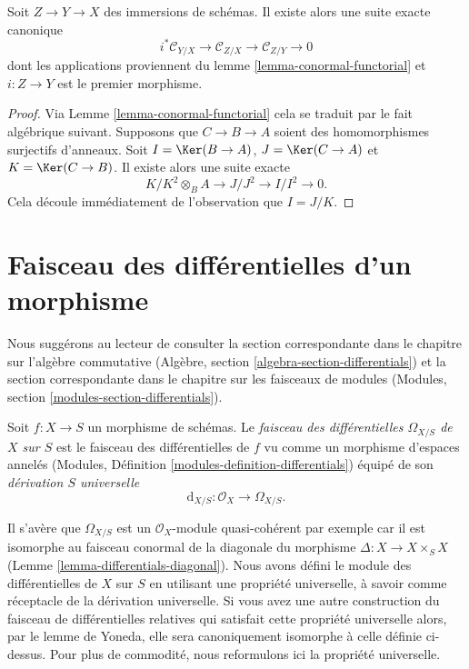 \begin{lemma}
\label{lemma-transitivity-conormal}
Soit $Z \to Y \to X$ des immersions de schémas. Il existe alors une suite exacte
canonique
$$
i^*\mathcal{C}_{Y/X} \to
\mathcal{C}_{Z/X} \to
\mathcal{C}_{Z/Y} \to 0
$$
dont les applications proviennent
du lemme \ref{lemma-conormal-functorial} et
$i : Z \to Y$ est le premier morphisme.
\end{lemma}

\begin{proof}
Via
Lemme \ref{lemma-conormal-functorial} cela se traduit
par le fait algébrique suivant. Supposons que $C \to B \to A$
soient des homomorphismes surjectifs d'anneaux. Soit $I = \Ker(B \to A)$,
$J = \Ker(C \to A)$ et $K = \Ker(C \to B)$. Il existe
alors une suite exacte
$$
K/K^2 \otimes_B A \to J/J^2 \to I/I^2 \to 0.
$$
Cela découle immédiatement de l'observation que $I = J/K$.
\end{proof}










\section{Faisceau des différentielles d'un morphisme}
\label{section-sheaf-differentials}

\noindent
Nous suggérons au lecteur de consulter la section correspondante
dans le chapitre sur l'algèbre
commutative (Algèbre, section \ref{algebra-section-differentials})
et la section correspondante dans le chapitre sur les faisceaux
de modules (Modules, section \ref{modules-section-differentials}).

\begin{definition}
\label{definition-sheaf-differentials}
Soit $f : X \to S$ un morphisme de schémas. Le {\it
faisceau des différentielles $\Omega_{X/S}$ de $X$ sur $S$}
est le faisceau des différentielles de $f$ vu comme un morphisme d'espaces
annelés (Modules, Définition \ref{modules-definition-differentials}) équipé de son {\it
dérivation $S$ universelle}
$$
\text{d}_{X/S} : \mathcal{O}_X \longrightarrow \Omega_{X/S}.
$$
\end{definition}

\noindent
Il s'avère que $\Omega_{X/S}$ est un $\mathcal{O}_X$-module quasi-cohérent par exemple
car il est isomorphe au faisceau conormal de la diagonale
du morphisme $\Delta : X \to X \times_S X$ (Lemme \ref{lemma-differentials-diagonal}). Nous avons
défini le module des différentielles de $X$
sur $S$ en utilisant une propriété universelle, à savoir
comme réceptacle de la dérivation universelle. Si vous avez une autre
construction du faisceau de différentielles relatives qui satisfait cette propriété
universelle alors, par le lemme de Yoneda, elle sera canoniquement
isomorphe à celle définie ci-dessus. Pour plus de commodité, nous reformulons
ici la propriété universelle.

